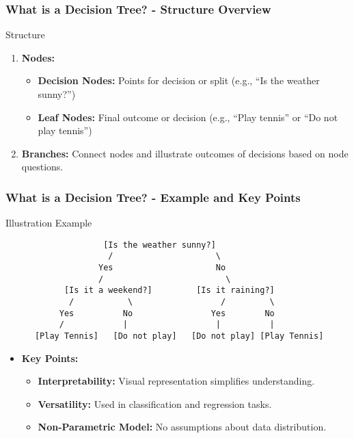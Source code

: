 \documentclass[aspectratio=169]{beamer}
\begin{document}
\begin{frame}[fragile]
    \frametitle{What is a Decision Tree? - Structure Overview}
    \begin{block}{Structure}
        \begin{enumerate}
            \item \textbf{Nodes:}
                \begin{itemize}
                    \item \textbf{Decision Nodes:} Points for decision or split (e.g., “Is the weather sunny?”)
                    \item \textbf{Leaf Nodes:} Final outcome or decision (e.g., “Play tennis” or “Do not play tennis”)
                \end{itemize}
            \item \textbf{Branches:} Connect nodes and illustrate outcomes of decisions based on node questions.
        \end{enumerate}
    \end{block}
\end{frame}

\begin{frame}[fragile]
    \frametitle{What is a Decision Tree? - Example and Key Points}
    \begin{block}{Illustration Example}
        \begin{verbatim}
                    [Is the weather sunny?]
                     /                     \
                   Yes                     No
                   /                         \
            [Is it a weekend?]         [Is it raining?]
             /           \                  /         \
           Yes          No                Yes        No
           /            |                  |          |
      [Play Tennis]   [Do not play]   [Do not play] [Play Tennis]
        \end{verbatim}
    \end{block}

    \begin{itemize}
        \item \textbf{Key Points:}
        \begin{itemize}
            \item \textbf{Interpretability:} Visual representation simplifies understanding.
            \item \textbf{Versatility:} Used in classification and regression tasks.
            \item \textbf{Non-Parametric Model:} No assumptions about data distribution.
        \end{itemize}
    \end{itemize}
\end{frame}
\end{document}
